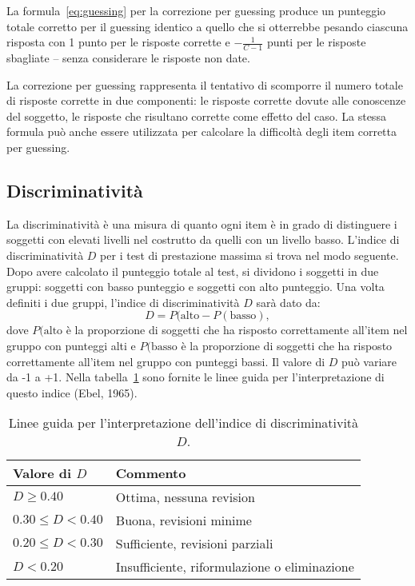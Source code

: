 La formula~\ref{eq:guessing} per la correzione per  guessing
produce un punteggio totale corretto per il guessing identico a quello che si otterrebbe 
pesando ciascuna risposta con 1 punto per le risposte corrette e $- \frac{1}{C-1}$ punti per le risposte sbagliate -- senza considerare le risposte non date.

La correzione per  guessing rappresenta il tentativo
    di scomporre il numero totale di risposte corrette in due
    componenti: 
le risposte corrette dovute alle conoscenze del
    soggetto,
 le risposte che risultano corrette come effetto del caso. 
La  stessa formula può anche essere utilizzata per calcolare la
    difficoltà degli item corretta per guessing. 


\subsection{Discriminatività}

La discriminatività è una misura di quanto ogni item è in grado di distinguere i soggetti con elevati livelli nel costrutto da quelli con un livello basso. L'indice di discriminatività $D$ per i test di prestazione massima si trova nel modo seguente. Dopo avere calcolato il punteggio totale al test, si dividono i soggetti in due gruppi: soggetti con basso punteggio e soggetti con alto punteggio. Una volta definiti i due gruppi, l'indice di discriminatività $D$ sarà dato da:
\[
D = P(\text{alto} - P(\text{basso}),
\]
dove $P(\text{alto}$ è la proporzione di soggetti che ha risposto correttamente all'item nel gruppo con punteggi alti e $P(\text{basso}$ è la proporzione di soggetti che ha risposto correttamente all'item nel gruppo con punteggi bassi. Il valore di $D$ può variare da -1 a +1.  Nella tabella~\ref{tab:ebel_1965} sono fornite le linee guida per l'interpretazione di questo indice (Ebel, 1965).

\begin{table}[h!]
\caption{Linee guida per l'interpretazione dell'indice di discriminatività $D$.}
\centering
\begin{tabular}{ll}
\hline
Valore di $D$ & Commento \\ [0.5ex] %
\hline
$D \geq 0.40$ & Ottima, nessuna revision\\
$0.30 \leq D < 0.40$ & Buona, revisioni minime\\ 
$0.20 \leq D < 0.30$ & Sufficiente,  revisioni parziali\\ 
$D < 0.20$ & Insufficiente, riformulazione o eliminazione\\ 
[1ex]
\hline
\end{tabular}
\label{tab:ebel_1965}
\end{table}

